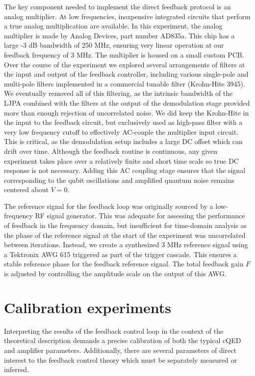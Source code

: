 The key component needed to implement the direct feedback protocol is an analog multiplier.  At low frequencies, inexpensive integrated circuits that perform a true analog multiplication are available.  In this experiment, the analog multiplier is made by Analog Devices, part number AD835a.  This chip has a large -3 dB bandwidth of 250 MHz, ensuring very linear operation at our feedback frequency of 3 MHz.  The multiplier is housed on a small custom PCB.  Over the course of the experiment we explored several arrangements of filters at the input and output of the feedback controller, including various single-pole and multi-pole filters implemented in a commercial tunable filter (Krohn-Hite 3945).  We eventually removed all of this filtering, as the intrinsic bandwidth of the LJPA combined with the filters at the output of the demodulation stage provided more than enough rejection of uncorrelated noise.  We did keep the Krohn-Hite in the input to the feedback circuit, but exclusively used as high-pass filter with a very low frequency cutoff to effectively AC-couple the multiplier input circuit.  This is critical, as the demodulation setup includes a large DC offset which can drift over time.  Although the feedback routine is continuous, any given experiment takes place over a relatively finite and short time scale so true DC response is not necessary.  Adding this AC coupling stage ensures that the signal corresponding to the qubit oscillations and amplified quantum noise remains centered about $V = 0$.

The reference signal for the feedback loop was originally sourced by a low-frequency RF signal generator.  This was adequate for assessing the performance of feedback in the frequency domain, but insufficient for time-domain analysis as the phase of the reference signal at the start of the experiment was uncorrelated between iterations.  Instead, we create a synthesized 3 MHz reference signal using a Tektronix AWG 615 triggered as part of the trigger cascade.  This ensures a stable reference phase for the feedback reference signal.  The total feedback gain $F$ is adjusted by controlling the amplitude scale on the output of this AWG.

\section{Calibration experiments}

Interpreting the results of the feedback control loop in the context of the theoretical description demands a precise calibration of both the typical cQED and amplifier parameters.  Additionally, there are several parameters of direct interest to the feedback control theory which must be separately measured or inferred.

